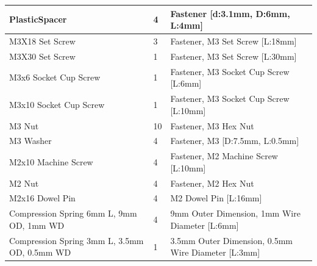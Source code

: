 \begin{table}[h!]
{\begin{tabular}{ | l | l | l |}
			PlasticSpacer & 4 & Fastener [d:3.1mm, D:6mm, L:4mm] \\ \hline
			M3X18 Set Screw & 3 & Fastener, M3 Set Screw [L:18mm]  \\ \hline	
			M3X30 Set Screw & 1 & Fastener, M3 Set Screw [L:30mm]  \\ \hline	
			M3x6 Socket Cup Screw & 1 & Fastener, M3 Socket Cup Screw [L:6mm] \\ \hline
			M3x10 Socket Cup Screw & 1 & Fastener, M3 Socket Cup Screw [L:10mm] \\ \hline
			M3 Nut & 10 & Fastener, M3 Hex Nut \\ \hline
			M3 Washer & 4 & Fastener, M3 [D:7.5mm, L:0.5mm] \\ \hline
			M2x10 Machine Screw & 4 & Fastener, M2 Machine Screw [L:10mm] \\ \hline
			M2 Nut & 4 & Fastener, M2 Hex Nut \\ \hline
			M2x16 Dowel Pin & 4 & M2 Dowel Pin [L:16mm] \\ \hline
			Compression Spring 6mm L, 9mm OD, 1mm WD & 4 & 9mm Outer Dimension, 1mm Wire Diameter [L:6mm]\\ \hline
		    Compression Spring 3mm L, 3.5mm OD, 0.5mm WD & 1 & 3.5mm Outer Dimension, 0.5mm Wire Diameter [L:3mm]  \\ \hline
		\end{tabular}
	}
\end{table}

\vspace{0.2cm}

